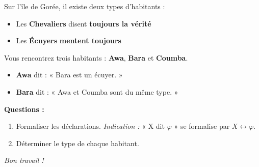 \documentclass[11pt,a4paper]{article}
\begin{document}
\begin{exercice}
Sur l'île de Gorée, il existe deux types d'habitants :
\begin{itemize}
    \item Les \textbf{Chevaliers} disent \textbf{toujours la vérité}
    \item Les \textbf{Écuyers} \textbf{mentent toujours}
\end{itemize}

Vous rencontrez trois habitants : \textbf{Awa}, \textbf{Bara} et \textbf{Coumba}.

\begin{itemize}
    \item \textbf{Awa} dit : « Bara est un écuyer. »
    \item \textbf{Bara} dit : « Awa et Coumba sont du même type. »
\end{itemize}

\textbf{Questions :}
\begin{enumerate}[label=\alph*)]
    \item Formaliser les déclarations. \textit{Indication :} « X dit $\varphi$ » se formalise par $X \leftrightarrow \varphi$.
    \item Déterminer le type de chaque habitant.
\end{enumerate}
\end{exercice}

\vfill
\begin{center}
\textit{Bon travail !}
\end{center}
\end{document}

